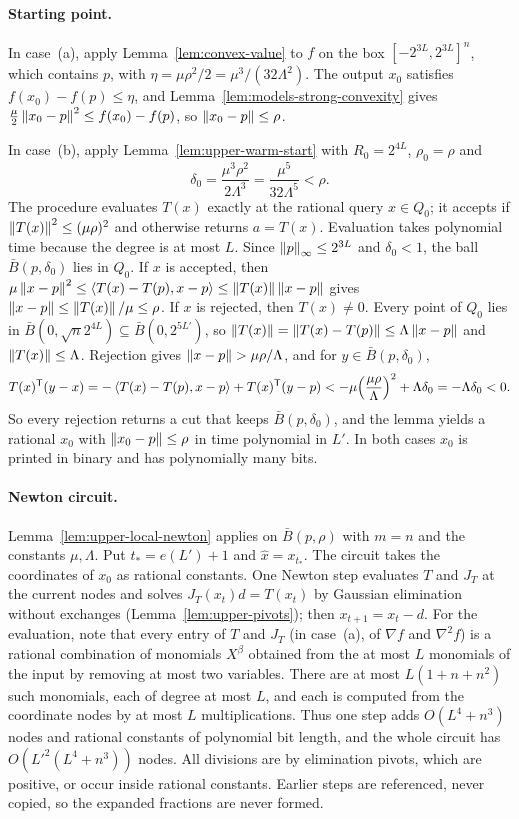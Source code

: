 \paragraph{Starting point.}
In case~(a), apply Lemma~\ref{lem:convex-value} to $f$ on the box
$[-2^{3L},2^{3L}]^n$, which contains $p$, with
$\eta=\mu\rho^2/2=\mu^3/(32\Lambda^2)$. The output $x_0$ satisfies
$f(x_0)-f(p)\le\eta$, and Lemma~\ref{lem:models-strong-convexity} gives
$\frac\mu2\left\lVert x_0-p\right\rVert^2\le f(x_0)-f(p)$, so $\left\lVert x_0-p\right\rVert\le\rho$.

In case~(b), apply Lemma~\ref{lem:upper-warm-start} with $R_0=2^{4L}$,
$\rho_0=\rho$ and
\[
 \delta_0=\frac{\mu^3\rho^2}{2\Lambda^3}=\frac{\mu^5}{32\Lambda^5}<\rho .
\]
The procedure evaluates $T(x)$ exactly at the rational query $x\in Q_0$; it
accepts if $\left\lVert T(x)\right\rVert^2\le(\mu\rho)^2$ and otherwise returns $a=T(x)$.
Evaluation takes polynomial time because the degree is at most $L$. Since
$\left\lVert p\right\rVert_\infty\le2^{3L}$ and $\delta_0<1$, the ball $\bar B(p,\delta_0)$ lies
in $Q_0$. If $x$ is accepted, then
$\mu\left\lVert x-p\right\rVert^2\le\left\langle T(x)-T(p),x-p\right\rangle\le\left\lVert T(x)\right\rVert\left\lVert x-p\right\rVert$ gives
$\left\lVert x-p\right\rVert\le\left\lVert T(x)\right\rVert/\mu\le\rho$. If $x$ is rejected, then $T(x)\ne0$.
Every point of $Q_0$ lies in $\bar B(0,\sqrt n2^{4L})\subseteq\bar B(0,2^{5L'})$,
so $\left\lVert T(x)\right\rVert=\left\lVert T(x)-T(p)\right\rVert\le\Lambda\left\lVert x-p\right\rVert$ and
$\left\lVert T(x)\right\rVert\le\Lambda$. Rejection gives $\left\lVert x-p\right\rVert>\mu\rho/\Lambda$, and for
$y\in\bar B(p,\delta_0)$,
\[
 T(x)^{\mathsf T}(y-x)=-\left\langle T(x)-T(p),x-p\right\rangle+T(x)^{\mathsf T}(y-p)
 <-\mu\Bigl(\frac{\mu\rho}{\Lambda}\Bigr)^2+\Lambda\delta_0
 =-\Lambda\delta_0<0 .
\]
So every rejection returns a cut that keeps $\bar B(p,\delta_0)$, and the
lemma yields a rational $x_0$ with $\left\lVert x_0-p\right\rVert\le\rho$ in time polynomial
in $L'$. In both cases $x_0$ is printed in binary and has polynomially many
bits.

\paragraph{Newton circuit.}
Lemma~\ref{lem:upper-local-newton} applies on $\bar B(p,\rho)$ with $m=n$ and
the constants $\mu,\Lambda$. Put $t_*=e(L')+1$ and $\hat x=x_{t_*}$. The
circuit takes the coordinates of $x_0$ as rational constants. One Newton step
evaluates $T$ and $J_T$ at the current nodes and solves
$J_T(x_t)d=T(x_t)$ by Gaussian elimination without exchanges
(Lemma~\ref{lem:upper-pivots}); then $x_{t+1}=x_t-d$. For the evaluation,
note that every entry of $T$ and $J_T$ (in case~(a), of $\nabla f$ and
$\nabla^2f$) is a rational combination of monomials $X^\beta$ obtained from
the at most $L$ monomials of the input by removing at most two variables.
There are at most $L(1+n+n^2)$ such monomials, each of degree at most $L$,
and each is computed from the coordinate nodes by at most $L$ multiplications.
Thus one step adds $O(L^4+n^3)$ nodes and rational constants of polynomial
bit length, and the whole circuit has $O(L'^2(L^4+n^3))$ nodes. All divisions
are by elimination pivots, which are positive, or occur inside rational
constants. Earlier steps are referenced, never copied, so the expanded
fractions are never formed.

